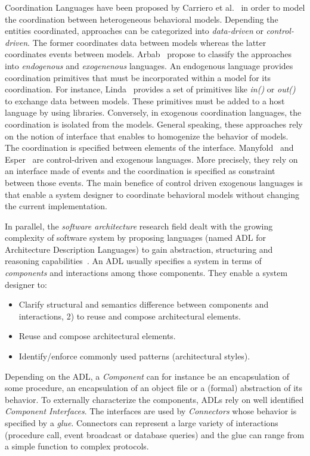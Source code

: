 Coordination Languages have been proposed by Carriero et al.~\cite{coordsignibib} in order to model the coordination between heterogeneous behavioral models. Depending the entities coordinated, approaches can be categorized into \emph{data-driven} or \emph{control-driven}. The former coordinates data between models whereas the latter coordinates events between models. Arbab~\cite{whatdocoord} propose to classify the approaches into \emph{endogenous} and \emph{exogenenous} languages. An endogenous language provides coordination primitives that must be incorporated within a model for its coordination. For instance, Linda~\cite{lindabib} provides a set of primitives like \emph{in()} or \emph{out()} to exchange data between models. These primitives must be added to a host language by using libraries. Conversely, in exogenous coordination languages, the coordination is isolated from the models. General speaking, these approaches rely on the notion of interface that enables to homogenize the behavior of models. The coordination is specified between elements of the interface. Manyfold~\cite{manifoldbib} and Esper~\cite{esperbib} are control-driven and exogenous languages. More precisely, they rely on an interface made of events and the coordination is specified as constraint between those events. The main benefice of control driven exogenous languages is that enable a system designer to coordinate behavioral models without changing the current implementation.

In parallel, the \emph{software architecture} research field dealt with the growing complexity of software system by proposing languages (named ADL for Architecture Description Languages) to gain abstraction, structuring and reasoning capabilities~\cite{rapidebib,wrightbib,uniconbib,frameadlsbib,garlansoftarchbib}. An ADL usually specifies a system in terms of \emph{components} and interactions among those components. They enable a system designer to:
\begin{itemize}
	\item Clarify structural and semantics difference between components and interactions, 2) to reuse and compose architectural elements.
	\item Reuse and compose architectural elements.
	\item Identify/enforce commonly used patterns (\eg architectural styles).
\end{itemize}
Depending on the ADL, a \emph{Component} can for instance be an encapsulation of some procedure, an encapsulation of an object file or a (formal) abstraction of its behavior. To externally characterize the components, ADLs rely on well identified \emph{Component Interfaces}. The interfaces are used by \emph{Connectors} whose behavior is specified by a \emph{glue}. Connectors can represent a large variety of interactions (\eg procedure call, event broadcast or database queries) and the glue can range from a simple function to complex protocols. 

